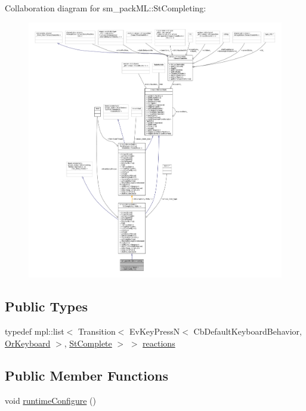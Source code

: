 Collaboration diagram for sm\+\_\+pack\+ML\+:\+:St\+Completing\+:
\nopagebreak
\begin{figure}[H]
\begin{center}
\leavevmode
\includegraphics[width=350pt]{structsm__packML_1_1StCompleting__coll__graph}
\end{center}
\end{figure}
\subsection*{Public Types}
\begin{DoxyCompactItemize}
\item 
typedef mpl\+::list$<$ Transition$<$ Ev\+Key\+PressN$<$ Cb\+Default\+Keyboard\+Behavior, \hyperlink{classsm__packML_1_1OrKeyboard}{Or\+Keyboard} $>$, \hyperlink{structsm__packML_1_1StComplete}{St\+Complete} $>$ $>$ \hyperlink{structsm__packML_1_1StCompleting_a081e556c39a3231f8a94a092c5b07583}{reactions}
\end{DoxyCompactItemize}
\subsection*{Public Member Functions}
\begin{DoxyCompactItemize}
\item 
void \hyperlink{structsm__packML_1_1StCompleting_a3d02e214c28fb1b9081aee053c608a8b}{runtime\+Configure} ()
\end{DoxyCompactItemize}
